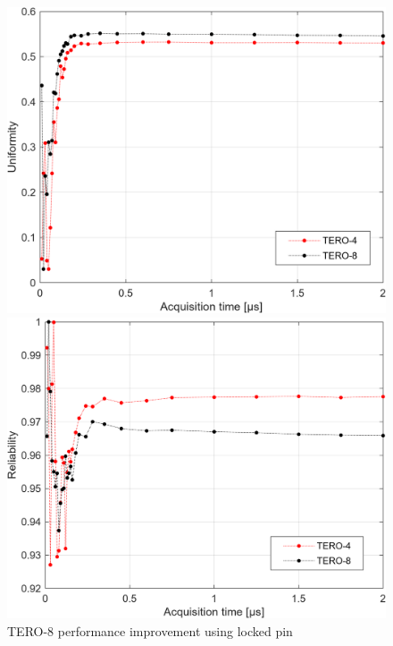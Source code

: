 \begin{figure}[H]
   \begin{minipage}[b]{0.50\linewidth}
      \centering \includegraphics[width=\linewidth]
      {images/unlocked_tero_8_intra_uniformity.png}
   \end{minipage}\hfill
   \begin{minipage}[b]{0.50\linewidth}   
      \centering \includegraphics[width=\linewidth]{images/unlocked_tero_8_intra_reliability.png}
   \end{minipage}
   \caption{\label{fig:locked_improvement_tero_8}TERO-8 performance improvement using locked pin}
\end{figure}

